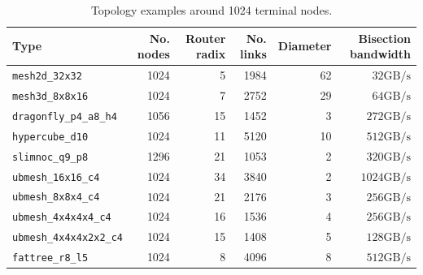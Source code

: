 \documentclass[11pt]{article}
\newcommand{\toponame}[1]{\texttt{#1}}
\newcommand{\Gbps}{\mathrm{GB/s}}
\begin{document}
\begin{table}[htbp]
\centering
\caption{Topology examples around 1024 terminal nodes.}
\label{tab:examples-1024}
\begin{tabular}{@{}lrrrrr@{}}
\toprule
Type & No. nodes & Router radix & No. links & Diameter & Bisection bandwidth \\
\midrule
\toponame{mesh2d\_32x32} & 1024 & 5 & 1984 & 62 & $32\Gbps$ \\
\toponame{mesh3d\_8x8x16} & 1024 & 7 & 2752 & 29 & $64\Gbps$ \\
\toponame{dragonfly\_p4\_a8\_h4} & 1056 & 15 & 1452 & 3 & $272\Gbps$ \\
\toponame{hypercube\_d10} & 1024 & 11 & 5120 & 10 & $512\Gbps$ \\
\toponame{slimnoc\_q9\_p8} & 1296 & 21 & 1053 & 2 & $320\Gbps$ \\
\toponame{ubmesh\_16x16\_c4} & 1024 & 34 & 3840 & 2 & $1024\Gbps$ \\
\toponame{ubmesh\_8x8x4\_c4} & 1024 & 21 & 2176 & 3 & $256\Gbps$ \\
\toponame{ubmesh\_4x4x4x4\_c4} & 1024 & 16 & 1536 & 4 & $256\Gbps$ \\
\toponame{ubmesh\_4x4x4x2x2\_c4} & 1024 & 15 & 1408 & 5 & $128\Gbps$ \\
\toponame{fattree\_r8\_l5} & 1024 & 8 & 4096 & 8 & $512\Gbps$ \\
\bottomrule
\end{tabular}
\end{table}



\end{document}
